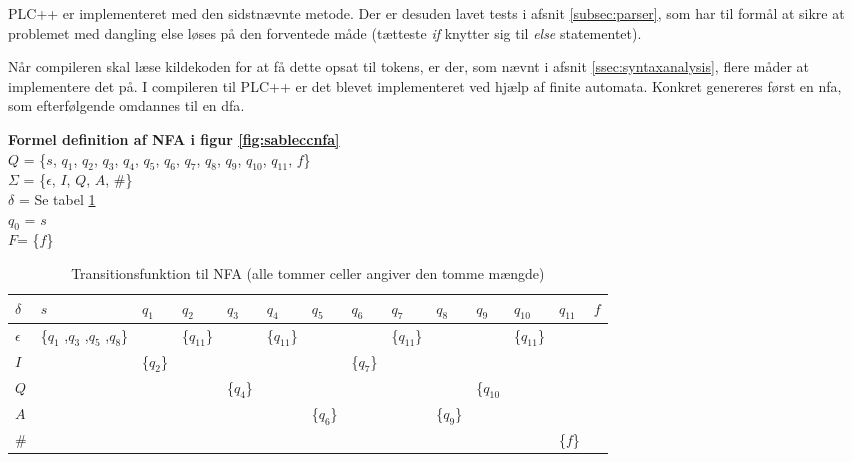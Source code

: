 \noindent PLC++ er implementeret med den sidstnævnte metode. Der er desuden lavet tests i afsnit \ref{subsec:parser}, som har til formål at sikre at problemet med dangling else løses på den forventede måde (tætteste \textit{if} knytter sig til \textit{else} statementet).

\noindent Når compileren skal læse kildekoden for at få dette opsat til tokens, er der, som nævnt i afsnit \ref{ssec:syntaxanalysis}, flere måder at implementere det på. I compileren til PLC++ er det blevet implementeret ved hjælp af finite automata. Konkret genereres først en \gls{nfa}, som efterfølgende omdannes til en \gls{dfa}.


\noindent \textbf{Formel definition af NFA i figur \ref{fig:sableccnfa}}\\
\noindent $Q$ = \{$s$, $q_1$, $q_2$, $q_3$, $q_4$, $q_5$, $q_6$, $q_7$, $q_8$, $q_9$, $q_{10}$, $q_{11}$, $f$\}\\
\noindent $\Sigma$ = \{$\epsilon$, $I$, $Q$, $A$, $\#$\}\\
\noindent $\delta$ = Se tabel \ref{tab:nfadelta}\\
\noindent $q_0$ = $s$\\
\noindent $F$= \{$f$\}\\


\begin{table}[H]
\centering
\footnotesize
{}
\begin{tabular}{l@{\hskip\tabcolsep\vrule width 1pt\hskip\tabcolsep}l|l|l|l|l|l|l|l|l|l|l|l|l}

$\delta$         & $s$              & $q_{1}$ & $q_{2}$ & $q_{3}$ & $q_{4}$ & $q_{5}$ & $q_{6}$ & $q_{7}$ & $q_{8}$ & $q_{9}$ & $q_{10}$ & $q_{11}$ & $f$ \\ \bottomrule
$\epsilon$ & \{$q_{1}$ ,$q_{3}$ ,$q_{5}$ ,$q_{8}$\} &   & \{$q_{11}$\} &   & \{$q_{11}$\} & & & \{$q_{11}$\} & & & \{$q_{11}$\} & &\\ 
$I$ & & \{$q_2$\} & &       & &       & \{$q_7$\} & &       &          & &     & \\ 
$Q$ & &       & & \{$q_4$\} & &       &       & &       & \{$q_{10}$ & &     & \\ 
$A$ & &       & &       & & \{$q_6$\} &       & & \{$q_9$\} &          & &     & \\ 
\#  & &       & &       & &       &       & &       &          & & \{$f$\} & \\
\end{tabular}
	\caption{Transitionsfunktion til NFA (alle tommer celler angiver den tomme mængde)}
    \label{tab:nfadelta}
\end{table}

